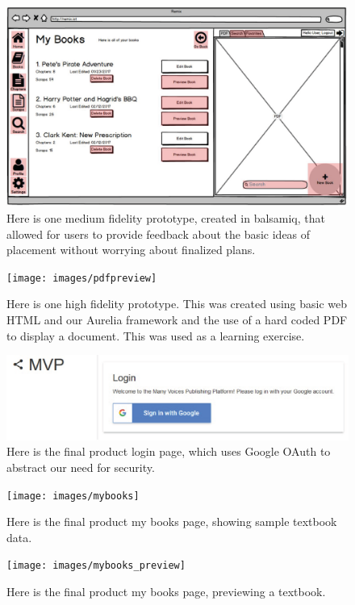 \documentclass[onecolumn, draftclsnofoot,10pt, compsoc]{IEEEtran}
\begin{document}
\begin{figure}[ht!]
	\centering
	\includegraphics[width=12cm]{images/balsamiq}
	\caption{Here is one medium fidelity prototype, created in balsamiq, that allowed for users to provide feedback about the basic ideas of placement without worrying about finalized plans.}
\end{figure}

\begin{figure}[ht!]
	\centering
	\texttt{[image: images/pdfpreview]}
	\caption{Here is one high fidelity prototype. This was created using basic web HTML and our Aurelia framework and the use of a hard coded PDF to display a document. This was used as a learning exercise.}
\end{figure}

\begin{figure}[ht!]
	\centering
	\includegraphics[width=12cm]{images/login_page}
	\caption{Here is the final product login page, which uses Google OAuth to abstract our need for security.}
\end{figure}

\begin{figure}[ht!]
	\centering
	\texttt{[image: images/mybooks]}
	\caption{Here is the final product my books page, showing sample textbook data.}
\end{figure}

\begin{figure}[ht!]
	\centering
	\texttt{[image: images/mybooks\_preview]}
	\caption{Here is the final product my books page, previewing a textbook.}
\end{figure}
\end{document}
